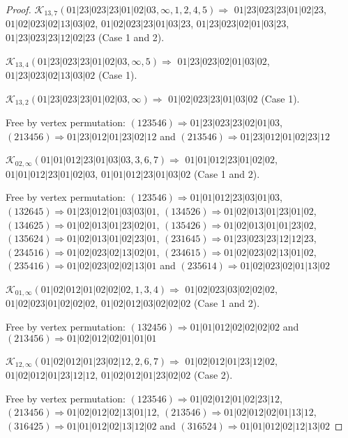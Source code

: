 \documentclass[12pt]{article}
\theoremstyle{plain}
\theoremstyle{definition}
\theoremstyle{remark}
\newcommand{\fancy}[1]{\mathcal{#1}}
\def\K{\fancy{K}}
\begin{document}
\begin{proof}
	\bigskip
	
	$\K_{13,7}(01|23|023|23|01|02|03,\infty,1, 2, 4, 5)\Rightarrow $ $01|23|023|23|01|02|23$, $01|02|023|02|13|03|02$, $01|02|023|23|01|03|23$, $01|23|023|02|01|03|23$, $01|23|023|23|12|02|23$ (Case 1 and 2).
	
	$\K_{13,4}(01|23|023|23|01|02|03,\infty,5)\Rightarrow $ $01|23|023|02|01|03|02$, $01|23|023|02|13|03|02$ (Case 1).
	
	$\K_{13,2}(01|23|023|23|01|02|03,\infty)\Rightarrow $ $01|02|023|23|01|03|02$ (Case 1).
	
	
	
	Free by vertex permutation: $(1 2 3 5 4 6)\Rightarrow 01|23|023|23|02|01|03$, $(2 1 3 4 5 6)\Rightarrow 01|23|012|01|23|02|12$ and $(2 1 3 5 4 6)\Rightarrow 01|23|012|01|02|23|12$
	
	
	
	\bigskip
	
	$\K_{02,\infty}(01|01|012|23|01|03|03,3, 6, 7)\Rightarrow $ $01|01|012|23|01|02|02$, $01|01|012|23|01|02|03$, $01|01|012|23|01|03|02$ (Case 1 and 2).
	
	
	
	Free by vertex permutation: $(1 2 3 5 4 6)\Rightarrow 01|01|012|23|03|01|03$, $(1 3 2 6 4 5)\Rightarrow 01|23|012|01|03|03|01$, $(1 3 4 5 2 6)\Rightarrow 01|02|013|01|23|01|02$, $(1 3 4 6 2 5)\Rightarrow 01|02|013|01|23|02|01$, $(1 3 5 4 2 6)\Rightarrow 01|02|013|01|01|23|02$, $(1 3 5 6 2 4)\Rightarrow 01|02|013|01|02|23|01$, $(2 3 1 6 4 5)\Rightarrow 01|23|023|23|12|12|23$, $(2 3 4 5 1 6)\Rightarrow 01|02|023|02|13|02|01$, $(2 3 4 6 1 5)\Rightarrow 01|02|023|02|13|01|02$, $(2 3 5 4 1 6)\Rightarrow 01|02|023|02|02|13|01$ and $(2 3 5 6 1 4)\Rightarrow 01|02|023|02|01|13|02$
	
	
	\bigskip
	
	$\K_{01,\infty}(01|02|012|01|02|02|02,1, 3, 4)\Rightarrow $ $01|02|023|03|02|02|02$, $01|02|023|01|02|02|02$, $01|02|012|03|02|02|02$ (Case 1 and 2).
	
	
	
	Free by vertex permutation: $(1 3 2 4 5 6)\Rightarrow 01|01|012|02|02|02|02$ and $(2 1 3 4 5 6)\Rightarrow 01|02|012|02|01|01|01$
	
	
	\bigskip
	
	$\K_{12,\infty}(01|02|012|01|23|02|12,2, 6, 7)\Rightarrow $ $01|02|012|01|23|12|02$, $01|02|012|01|23|12|12$, $01|02|012|01|23|02|02$ (Case 2).
	
	
	
	Free by vertex permutation: $(1 2 3 5 4 6)\Rightarrow 01|02|012|01|02|23|12$, $(2 1 3 4 5 6)\Rightarrow 01|02|012|02|13|01|12$, $(2 1 3 5 4 6)\Rightarrow 01|02|012|02|01|13|12$, $(3 1 6 4 2 5)\Rightarrow 01|01|012|02|13|12|02$ and $(3 1 6 5 2 4)\Rightarrow 01|01|012|02|12|13|02$
	

\end{proof}
\end{document}
